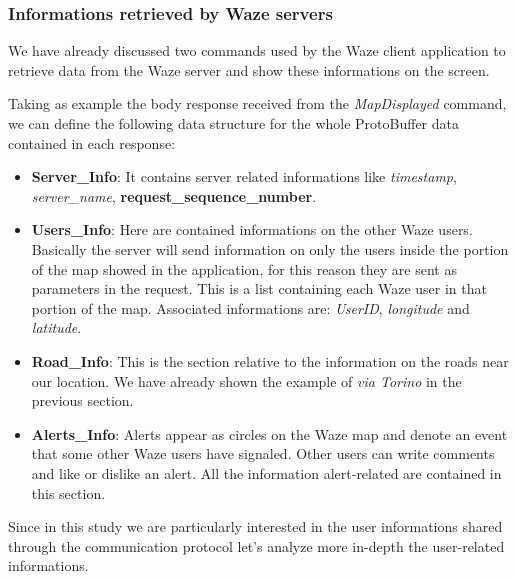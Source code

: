 		\subsubsection{Informations retrieved by Waze servers}
			\par We have already discussed two commands used by the Waze client application to retrieve data from the Waze server and show these informations on the screen. \newline
			\par Taking as example the body response received from the \textit{MapDisplayed} command, we can define the following data structure for the whole ProtoBuffer data contained in each response:
			\begin{itemize}
				\item \textbf{Server\_Info}: It contains server related informations like \textit{timestamp}, \textit{server\_name}, \textbf{request\_sequence\_number}.
				\item \textbf{Users\_Info}: Here are contained informations on the other Waze users. Basically the server will send information on only the users inside the portion of the map showed in the application, for this reason they are sent as parameters in the request. This is a list containing each Waze user in that portion of the map. Associated informations are: \textit{UserID}, \textit{longitude} and \textit{latitude}.
				\item \textbf{Road\_Info}: This is the section relative to the information on the roads near our location. We have already shown the example of \textit{via Torino} in the previous section.
				\item \textbf{Alerts\_Info}: Alerts appear as circles on the Waze map and denote an event that some other Waze users have signaled. Other users can write comments and like or dislike an alert. All the information alert-related are contained in this section.
			\end{itemize}
			\par Since in this study we are particularly interested in the user informations shared through the communication protocol let's analyze more in-depth the user-related informations.
			
